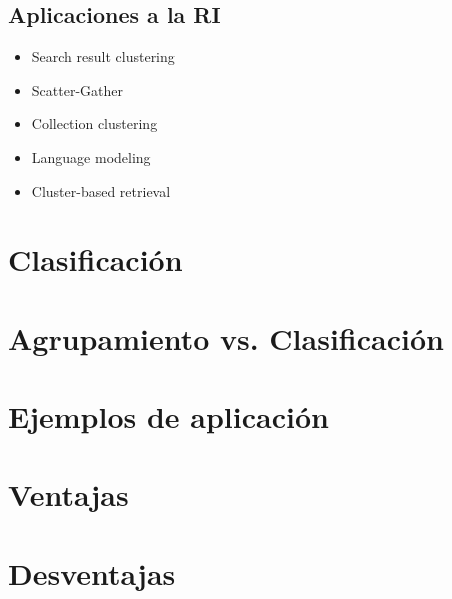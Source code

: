 \documentclass{llncs}
\begin{document}
\subsection{Aplicaciones a la RI} 
\begin{itemize}
	\item Search result clustering
	
	\item Scatter-Gather
	
	\item Collection clustering
	
	\item Language modeling
	
	\item Cluster-based retrieval
\end{itemize}

\section{Clasificaci\'on}

\section{Agrupamiento vs. Clasificaci\'on}

\section{Ejemplos de aplicación}

\section{Ventajas} 

\section{Desventajas} 
\end{document}
